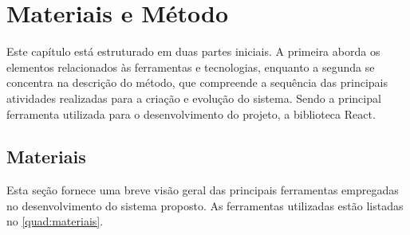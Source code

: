 
\chapter{Materiais e Método}\label{cap:materialemetodos}

Este capítulo está estruturado em duas partes iniciais. A primeira aborda os elementos relacionados às ferramentas e tecnologias, enquanto a segunda se concentra na descrição do método, que compreende a sequência das principais atividades realizadas para a criação e evolução do sistema. Sendo a principal ferramenta utilizada para o desenvolvimento do projeto, a biblioteca React.

\section{Materiais}\label{sec:materiais}

Esta seção fornece uma breve visão geral das principais ferramentas empregadas no desenvolvimento do sistema proposto. As ferramentas utilizadas estão listadas no \autoref{quad:materiais}.

